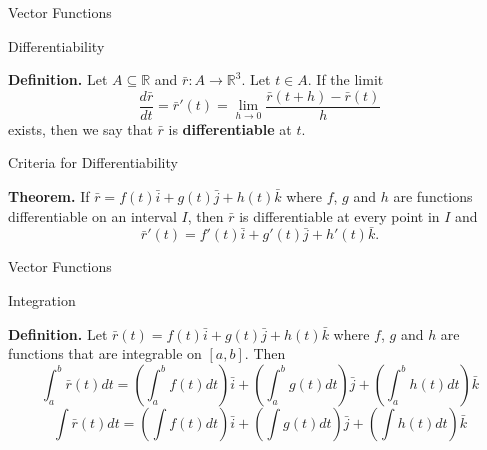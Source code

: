 \documentclass[aspectratio=169, UTF8]{ctexbeamer}
\begin{document}
    \begin{frame}[t]{Vector Functions}
        \begin{block}{Differentiability}
            \par \textbf{Definition.} Let $A \subseteq \mathbb{R}$ and $\bar{r}: A \to \mathbb{R}^3$. Let $t \in A$. If the limit
            \begin{equation*}
                \dfrac{d \bar{r}}{dt} = \bar{r}'(t) = \lim\limits_{h \to 0} \dfrac{\bar{r}(t+h) - \bar{r}(t)}{h}
            \end{equation*}
            exists, then we say that $\bar{r}$ is \textbf{differentiable} at $t$.
        \end{block}

        \begin{block}{Criteria for Differentiability}
            \par \textbf{Theorem.} If $\bar{r} = f(t) \bar{i} + g(t) \bar{j} + h(t) \bar{k}$ where $f$, $g$ and $h$ are functions differentiable on an interval $I$, then $\bar{r}$ is differentiable at every point in $I$ and 
            \begin{equation*}
                \bar{r}'(t) = f'(t) \bar{i} + g'(t) \bar{j} + h'(t) \bar{k} .
            \end{equation*}
        \end{block}
    \end{frame}

    \begin{frame}[t]{Vector Functions}
        \begin{block}{Integration}
            \par \textbf{Definition.} Let $\bar{r}(t) = f(t) \bar{i} + g(t) \bar{j} + h(t) \bar{k}$ where $f$, $g$ and $h$ are functions that are integrable on $[a,b]$. Then
            \begin{equation*}
                \int_{a}^{b} \bar{r}(t) d t=\left(\int_{a}^{b} f(t) d t\right) \bar{i}+\left(\int_{a}^{b} g(t) d t\right) \bar{j}+\left(\int_{a}^{b} h(t) d t\right) \bar{k}
            \end{equation*}
            \begin{equation*}
                \int \bar{r}(t) d t=\left(\int f(t) d t\right) \bar{i}+\left(\int g(t) d t\right) \bar{j}+\left(\int h(t) d t\right) \bar{k}
            \end{equation*}
        \end{block}
    \end{frame}
\end{document}
